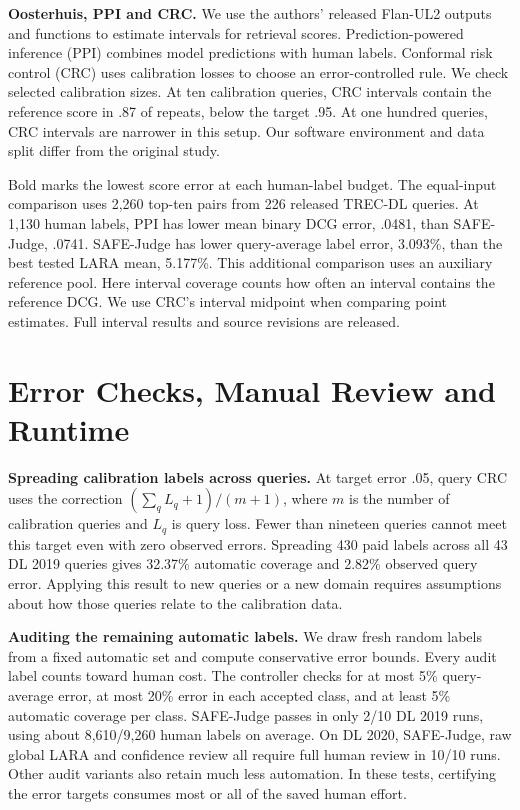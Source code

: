 \documentclass[11pt,a4paper]{article}
\begin{document}
\textbf{Oosterhuis, PPI and CRC.} We use the authors' released Flan-UL2 outputs
and functions to estimate intervals for retrieval scores. Prediction-powered
inference (PPI) combines model predictions with human labels. Conformal risk
control (CRC) uses calibration losses to choose an error-controlled rule.
We check selected calibration sizes. At ten calibration queries, CRC intervals
contain the reference score in .87 of repeats, below the target .95.
At one hundred queries, CRC intervals are narrower in this setup.
Our software environment and data split differ from the original study.
\begin{center}\small\end{center}
Bold marks the lowest score error at each human-label budget.
The equal-input comparison uses 2,260 top-ten pairs from 226 released TREC-DL
queries. At 1,130 human labels, PPI has lower mean binary DCG error, .0481,
than SAFE-Judge, .0741. SAFE-Judge has lower query-average label error, 3.093\%,
than the best tested LARA mean, 5.177\%. This additional comparison uses an
auxiliary reference pool. Here interval coverage counts how often an interval
contains the reference DCG. We use CRC's interval midpoint when comparing point
estimates. Full interval results and source revisions are released.

\section{Error Checks, Manual Review and Runtime}
\textbf{Spreading calibration labels across queries.} At target error .05,
query CRC uses the correction $(\sum_q L_q+1)/(m+1)$, where $m$ is the number
of calibration queries and $L_q$ is query loss. Fewer than nineteen queries
cannot meet this target even with zero observed errors. Spreading 430 paid
labels across all 43 DL 2019 queries gives 32.37\% automatic coverage and
2.82\% observed query error. Applying this result to new queries or a new
domain requires assumptions about how those queries relate to the calibration data.

\textbf{Auditing the remaining automatic labels.} We draw fresh random labels
from a fixed automatic set and compute conservative error bounds. Every audit
label counts toward human cost. The controller checks for at most 5\%
query-average error, at most 20\% error in each accepted class, and at least
5\% automatic coverage per class. SAFE-Judge passes in only 2/10 DL 2019 runs,
using about 8,610/9,260 human labels on average. On DL 2020, SAFE-Judge, raw
global LARA and confidence review all require full human review in 10/10 runs.
Other audit variants also retain much less automation. In these tests,
certifying the error targets consumes most or all of the saved human effort.
\end{document}
